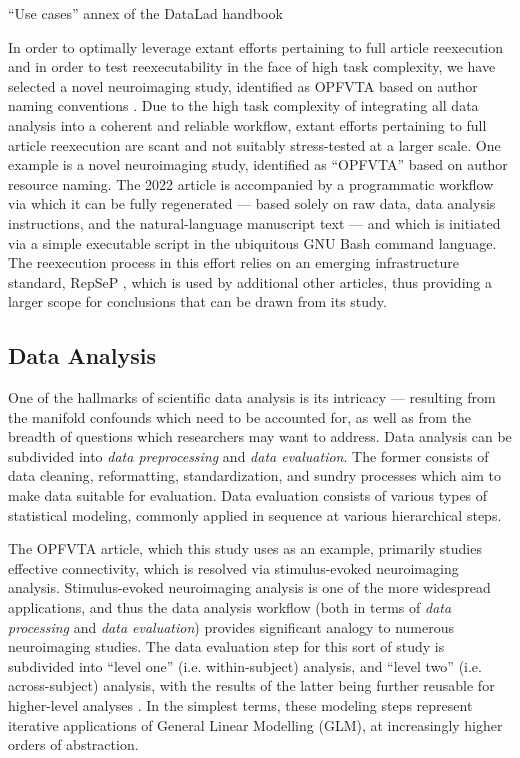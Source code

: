 “Use cases” annex of the DataLad handbook


In order to optimally leverage extant efforts pertaining to full article reexecution and in order to test reexecutability in the face of high task complexity, we have selected a novel neuroimaging study, identified as OPFVTA based on author naming conventions \cite{opfvta}.
Due to the high task complexity of integrating all data analysis into a coherent and reliable workflow, extant efforts pertaining to full article reexecution are scant and not suitably stress-tested at a larger scale.
One example is a novel neuroimaging study, identified as “OPFVTA” \cite{opfvta} based on author resource naming.
The 2022 article is accompanied by a programmatic workflow via which it can be fully regenerated — based solely on raw data, data analysis instructions, and the natural-language manuscript text — and which is initiated via a simple executable script in the ubiquitous GNU Bash \cite{bash} command language.
The reexecution process in this effort relies on an emerging infrastructure standard, RepSeP \cite{repsep}, which is used by additional other articles, thus providing a larger scope for conclusions that can be drawn from its study.


\subsection{Data Analysis}

One of the hallmarks of scientific data analysis is its intricacy — resulting from the manifold confounds which need to be accounted for, as well as from the breadth of questions which researchers may want to address.
Data analysis can be subdivided into \emph{data preprocessing} and \emph{data evaluation}.
The former consists of data cleaning, reformatting, standardization, and sundry processes which aim to make data suitable for evaluation.
Data evaluation consists of various types of statistical modeling, commonly applied in sequence at various hierarchical steps.

The OPFVTA article, which this study uses as an example, primarily studies effective connectivity, which is resolved via stimulus-evoked neuroimaging analysis.
Stimulus-evoked neuroimaging analysis is one of the more widespread applications, and thus the data analysis workflow (both in terms of \emph{data processing} and \emph{data evaluation}) provides significant analogy to numerous neuroimaging studies.
The data evaluation step for this sort of study is subdivided into “level one” (i.e. within-subject) analysis, and “level two” (i.e. across-subject) analysis, with the results of the latter being further reusable for higher-level analyses \cite{Friston1995}.
In the simplest terms, these modeling steps represent iterative applications of General Linear Modelling (GLM), at increasingly higher orders of abstraction.

